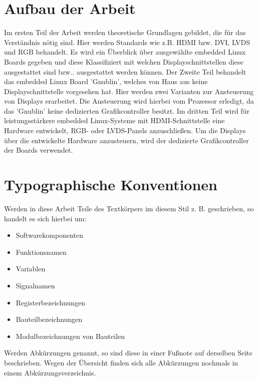 \section{Aufbau der Arbeit}
Im ersten Teil der Arbeit werden theoretische Grundlagen gebildet, die für das Verständnis nötig sind. Hier werden Standards wie z.B. HDMI bzw. DVI, LVDS und RGB behandelt. Es wird ein Überblick über ausgewählte embedded Linux Boards gegeben und diese Klassifiziert mit welchen Displayschnittstellen diese ausgestattet sind bzw.. ausgestattet werden können.
Der Zweite Teil behandelt das embedded Linux Board 'Gnublin', welches von Haus aus keine Displayschnittstelle vorgesehen hat. Hier werden zwei Varianten zur Ansteuerung von Displays erarbeitet. Die Ansteuerung wird hierbei vom Prozessor erledigt, da das 'Gnublin' keine dedizierten Grafikcontroller besitzt.
Im dritten Teil wird für leistungsstärkere embedded Linux-Systeme mit HDMI-Schnittstelle eine Hardware entwickelt, RGB- oder LVDS-Panels anzuschließen. Um die Displays über die entwickelte Hardware anzusteuern, wird der dedizierte Grafikcontroller der Boards verwendet.

\section{Typographische Konventionen}
Werden in diese Arbeit Teile des Textkörpers im diesem Stil z. B.  geschrieben, so handelt es sich hierbei um:
\begin{itemize}
\item Softwarekomponenten
\item Funktionsnamen
\item Variablen
\item Signalnamen
\item Registerbezeichnungen
\item Bauteilbezeichnungen
\item Modulbezeichnungen von Bauteilen
\end{itemize}
Werden Abkürzungen genannt, so sind diese in einer Fußnote auf derselben Seite beschrieben. Wegen der Übersicht finden sich alle Abkürzungen nochmals in einem Abkürzungsverzeichnis.


